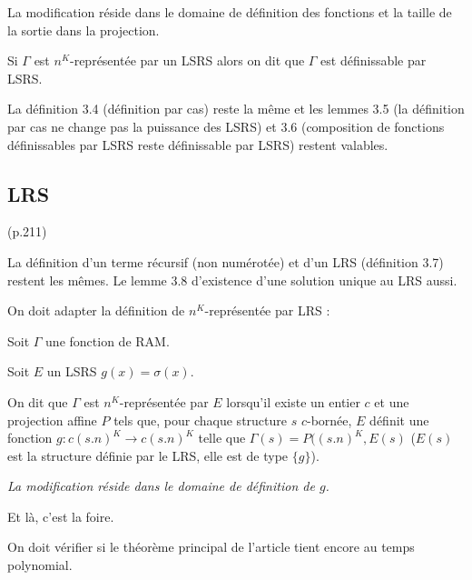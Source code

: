 		La modification réside dans le domaine de définition des fonctions et la taille de la sortie dans la projection.
		
%		
			
	
		Si $\Gamma$ est $n^K$-représentée par un LSRS alors on dit que $\Gamma$ est définissable par LSRS. 
		
		
		
		La définition 3.4 (définition par cas) reste la même et les lemmes 3.5 (la définition par cas ne change pas la puissance des LSRS) et 3.6 (composition de fonctions définissables par LSRS reste définissable par LSRS) restent valables.
		
		
		\subsection{LRS} (p.211)
			\label{subsec:LRS}
		
		
		La définition d'un terme récursif (non numérotée) et d'un LRS (définition 3.7) restent les mêmes. Le lemme 3.8 d'existence d'une solution unique au LRS aussi. 
		
		On doit adapter la définition de $n^K$-représentée par LRS : 
		
		\begin{definition}
			\label{def:representee_par_LRS}
			Soit $\Gamma$ une fonction de RAM. 
			
			Soit $E$ un LSRS $g(x) = \sigma(x)$. 
			
			On dit que $\Gamma$ est $n^K$-représentée par $E$ lorsqu'il existe un entier $c$ et une projection affine $P$ tels que, pour chaque structure $s$ $c$-bornée, $E$ définit une fonction $g : c (s.n)^K \to c (s.n)^K$ telle que $\Gamma(s) = P((s.n)^K, E(s)$ ($E(s)$ est la structure définie par le LRS, elle est de type $\{g\}$).
			
			\emph{La modification réside dans le domaine de définition de $g$.}
		\end{definition}
		
		Et là, c'est la foire.
		
		On doit vérifier si le théorème principal de l'article tient encore au temps polynomial.
		
